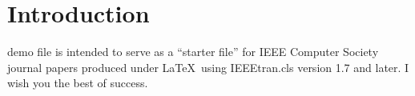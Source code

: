 \documentclass[12pt,journal,compsoc]{IEEEtran}
\begin{document}
\section{Introduction}
%
%



% 
% 
% 
% 
 demo file is intended to serve as a ``starter file''
for IEEE Computer Society journal papers produced under \LaTeX\ using
IEEEtran.cls version 1.7 and later.
I wish you the best of success.
\end{document}
